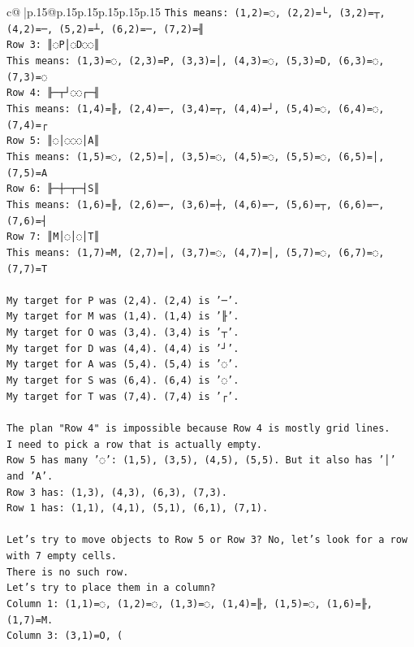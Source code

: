 \documentclass{article}
\begin{document}
{\begin{supertabular}{c@{$\;$}|p{.15\linewidth}@{}p{.15\linewidth}p{.15\linewidth}p{.15\linewidth}p{.15\linewidth}p{.15\linewidth}}
{{{\texttt{This means: (1,2)=◌, (2,2)=└, (3,2)=┬, (4,2)=─, (5,2)=┴, (6,2)=─, (7,2)=╢} \\
\texttt{Row 3: ║◌P│◌D◌◌║} \\
\texttt{This means: (1,3)=◌, (2,3)=P, (3,3)=│, (4,3)=◌, (5,3)=D, (6,3)=◌, (7,3)=◌} \\
\texttt{Row 4: ╟─┬┘◌◌┌─╢} \\
\texttt{This means: (1,4)=╟, (2,4)=─, (3,4)=┬, (4,4)=┘, (5,4)=◌, (6,4)=◌, (7,4)=┌} \\
\texttt{Row 5: ║◌│◌◌◌│A║} \\
\texttt{This means: (1,5)=◌, (2,5)=│, (3,5)=◌, (4,5)=◌, (5,5)=◌, (6,5)=│, (7,5)=A} \\
\texttt{Row 6: ╟─┼─┬─┤S║} \\
\texttt{This means: (1,6)=╟, (2,6)=─, (3,6)=┼, (4,6)=─, (5,6)=┬, (6,6)=─, (7,6)=┤} \\
\texttt{Row 7: ║M│◌│◌│T║} \\
\texttt{This means: (1,7)=M, (2,7)=│, (3,7)=◌, (4,7)=│, (5,7)=◌, (6,7)=◌, (7,7)=T} \\
\\ 
\texttt{My target for P was (2,4). (2,4) is '─'.} \\
\texttt{My target for M was (1,4). (1,4) is '╟'.} \\
\texttt{My target for O was (3,4). (3,4) is '┬'.} \\
\texttt{My target for D was (4,4). (4,4) is '┘'.} \\
\texttt{My target for A was (5,4). (5,4) is '◌'.} \\
\texttt{My target for S was (6,4). (6,4) is '◌'.} \\
\texttt{My target for T was (7,4). (7,4) is '┌'.} \\
\\ 
\texttt{The plan "Row 4" is impossible because Row 4 is mostly grid lines.} \\
\texttt{I need to pick a row that is actually empty.} \\
\texttt{Row 5 has many '◌': (1,5), (3,5), (4,5), (5,5). But it also has '│' and 'A'.} \\
\texttt{Row 3 has: (1,3), (4,3), (6,3), (7,3).} \\
\texttt{Row 1 has: (1,1), (4,1), (5,1), (6,1), (7,1).} \\
\\ 
\texttt{Let's try to move objects to Row 5 or Row 3? No, let's look for a row with 7 empty cells.} \\
\texttt{There is no such row.} \\
\texttt{Let's try to place them in a column?} \\
\texttt{Column 1: (1,1)=◌, (1,2)=◌, (1,3)=◌, (1,4)=╟, (1,5)=◌, (1,6)=╟, (1,7)=M.} \\
\texttt{Column 3: (3,1)=O, (} \\
            }
        }
    }
     \\ \\


\end{supertabular}}
\end{document}
